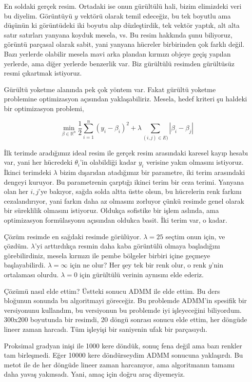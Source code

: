 \documentclass[12pt,fleqn]{article}\usepackage{../../common}
\begin{document}
En soldaki gerçek resim. Ortadaki ise onun gürültülü hali, bizim elimizdeki
veri bu diyelim. Görüntüyü $y$ vektörü olarak temil edeceğiz, bu tek
boyutlu ama düşünün ki görüntüdeki iki boyutu alıp düzleştirdik, tek vektör
yaptık, alt alta satır satırları yanyana koyduk mesela, vs. Bu resim
hakkında şunu biliyoruz, görüntü parçasal olarak sabit, yani yanyana
hücreler birbirinden çok farklı değil. Bazı yerlerde olabilir mesela mavi
arka plandan kırmızı objeye geçiş yapılan yerlerde, ama diğer yerlerde
benzerlik var. Biz gürültülü resimden gürültüsüz resmi çıkartmak istiyoruz.

Gürültü yoketme alanında pek çok yöntem var. Fakat gürültü yoketme
problemine optimizasyon açısından yaklaşabiliriz. Mesela, hedef kriteri şu
haldeki bir optimizasyon problemi,

$$
\min_{\beta \in \mathbb{R}^n} 
\frac{1}{2} \sum_{i=1}^{n} (y_i - \beta_i)^2 + 
\lambda \sum_{(i,j) \in E)}  |\beta_i - \beta_j|
$$

İlk terimde aradığımız ideal resim ile gerçek resim arasındaki karesel
kayıp hesabı var, yani her hücredeki $\theta_i$'in olabildiği kadar $y_i$
verisine yakın olmasını istiyoruz. İkinci terimdeki $\lambda$ bizim
dışarıdan atadığımız bir parametre, iki terim arasındaki dengeyi
kuruyor. Bu parametrenin çarptığı ikinci terim bir ceza terimi. Yanyana
olan her $i,j$'ye bakıyor, sağda solda altta üstte olsun, bu hücrelerin
renk farkını cezalandırıyor, yani farkın daha az olmasını zorluyor çünkü
resimde genel olarak bir süreklilik olmasını istiyoruz. Oldukça sofistike
bir işlem aslında, ama optimizasyon formülasyonu açısından oldukca
basit. İki terim var, o kadar.

Çözüm resimde en sağdaki resimde görülüyor. $\lambda=25$ seçtim onun için,
ve çözdüm. $\lambda$'yi arttırdıkça resmin daha kaba görüntülü olmaya
başladığını görebilirdiniz, mesela kırmızı ile pembe bölgeler birbiri içine
geçmeye başlayabilirdi. $\lambda=\infty$ için ne olur? Her şey tek bir renk
olur, o renk $y$'nin ortalaması olurdu. $\lambda=0$ için gürültülü verinin
aynısını elde ederiz. 

Çözümü nasıl elde ettim? Üstteki sonucu ADMM ile elde ettim. Bu ders
bloğunun sonunda bu algoritmayi göreceğiz. Bu problemde ADMM'in spesifik
bir versiyonunu kullandım, bu versiyonun bu problemde iyi işleyeceğini
biliyordum. 300x200 boyutunda bir resimdi, 20 döngü sonrası sonucu elde
ettim, her döngüde lineer zaman harcadı. Tüm işleyişi bir saniyenin ufak
bir parçasıydı. 

Proksimal gradyan inişi ile 1000 kere döndük, sonuç fena değil ama bazı
renkler tam birleşmedi. Eğer 10000 kere döndürseydim ADMM sonucuna
yaklaşırdı. Bu metot ile de her döngüde lineer zaman harcanıyor, ama
algoritmanın tamamı daha yavaş yakınsadı. Yani, amaç için doğru araç
diyemeyiz. 
\end{document}
